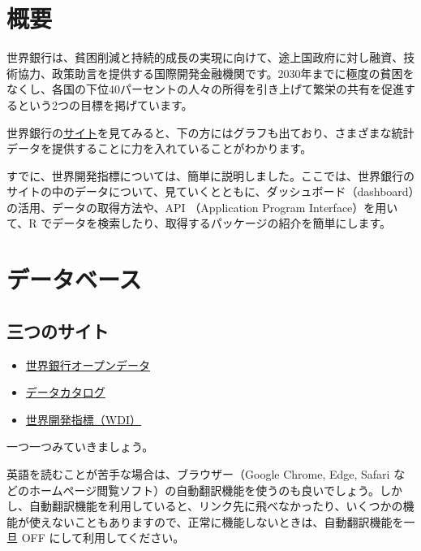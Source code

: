 \documentclass[
  xelatex, ja=standard]{bxjsbook}
\providecommand{\tightlist}{%
  \setlength{\itemsep}{0pt}\setlength{\parskip}{0pt}}
\theoremstyle{definition}
\theoremstyle{definition}
\theoremstyle{definition}
\theoremstyle{definition}
\theoremstyle{remark}
\begin{document}
\hypertarget{ux6982ux8981-2}{%
\section{概要}\label{ux6982ux8981-2}}

世界銀行は、貧困削減と持続的成長の実現に向けて、途上国政府に対し融資、技術協力、政策助言を提供する国際開発金融機関です。2030年までに極度の貧困をなくし、各国の下位40パーセントの人々の所得を引き上げて繁栄の共有を促進するという2つの目標を掲げています。

世界銀行の\href{https://www.worldbank.org/en/home}{サイト}を見てみると、下の方にはグラフも出ており、さまざまな統計データを提供することに力を入れていることがわかります。

すでに、世界開発指標については、簡単に説明しました。ここでは、世界銀行のサイトの中のデータについて、見ていくとともに、ダッシュボード（dashboard）の活用、データの取得方法や、API （Application Program Interface）を用いて、R でデータを検索したり、取得するパッケージの紹介を簡単にします。

\hypertarget{ux30c7ux30fcux30bfux30d9ux30fcux30b9}{%
\section{データベース}\label{ux30c7ux30fcux30bfux30d9ux30fcux30b9}}

\hypertarget{ux4e09ux3064ux306eux30b5ux30a4ux30c8}{%
\subsection{三つのサイト}\label{ux4e09ux3064ux306eux30b5ux30a4ux30c8}}

\begin{itemize}
\tightlist
\item
  \href{https://data.worldbank.org}{世界銀行オープンデータ}
\item
  \href{https://datacatalog.worldbank.org/home}{データカタログ}
\item
  \href{https://datatopics.worldbank.org/world-development-indicators/}{世界開発指標（WDI）}
\end{itemize}

一つ一つみていきましょう。

英語を読むことが苦手な場合は、ブラウザー（Google Chrome, Edge, Safari などのホームページ閲覧ソフト）の自動翻訳機能を使うのも良いでしょう。しかし、自動翻訳機能を利用していると、リンク先に飛べなかったり、いくつかの機能が使えないこともありますので、正常に機能しないときは、自動翻訳機能を一旦 OFF にして利用してください。
\end{document}
